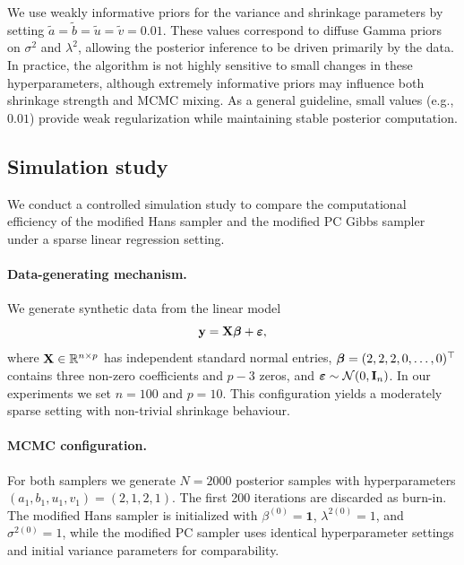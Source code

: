 We use weakly informative priors for the variance and shrinkage parameters by setting $\tilde a = \tilde b = \tilde u = \tilde v = 0.01$. These values correspond to diffuse Gamma priors on $\sigma^2$ and $\lambda^2$, allowing the posterior inference to be driven primarily by the data. In practice, the algorithm is not highly sensitive to small changes in these hyperparameters, although extremely informative priors may influence both shrinkage strength and MCMC mixing. As a general guideline, small values (e.g., $0.01$) provide weak regularization while maintaining stable posterior computation.


\subsection{Simulation study}\label{sec:simulation_study}


We conduct a controlled simulation study to compare the computational efficiency of the modified Hans sampler and the modified PC Gibbs sampler under a sparse linear regression setting.

\paragraph{Data-generating mechanism.}
We generate synthetic data from the linear model
\[
{\bf y} = {\bf X}{\boldsymbol \beta} + {\boldsymbol \varepsilon},
\]
where ${\bf X} \in \mathbb{R}^{n \times p}$ has independent standard normal entries, ${\boldsymbol \beta} = (2,2,2,0,\ldots,0)^\top$ contains three non-zero coefficients and $p-3$ zeros, and ${\boldsymbol \varepsilon} \sim \mathcal{N}(0,\textbf{I}_n)$. In our experiments we set $n=100$ and $p=10$. This configuration yields a moderately sparse setting with non-trivial shrinkage behaviour.

\paragraph{MCMC configuration.}
For both samplers we generate $N=2000$ posterior samples with hyperparameters $(a_1,b_1,u_1,v_1) = (2,1,2,1)$. The first 200 iterations are discarded as burn-in. The modified Hans sampler is initialized with $\beta^{(0)}=\mathbf{1}$, $\lambda^{2(0)}=1$, and $\sigma^{2(0)}=1$, while the modified PC sampler uses identical hyperparameter settings and initial variance parameters for comparability.


